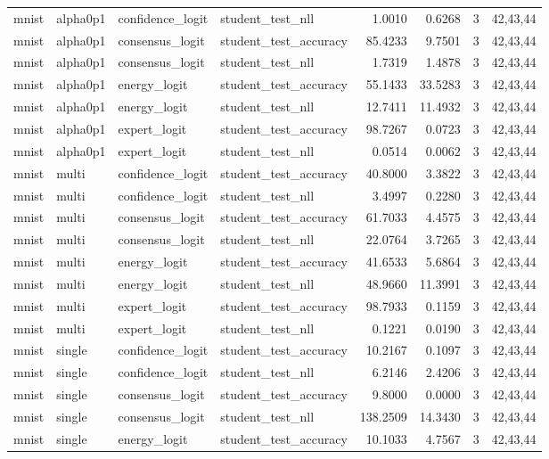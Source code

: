 \begin{tabular}{llllrrrl}
mnist & alpha0p1 & confidence\_logit & student\_test\_nll & 1.0010 & 0.6268 & 3 & 42,43,44 \\
mnist & alpha0p1 & consensus\_logit & student\_test\_accuracy & 85.4233 & 9.7501 & 3 & 42,43,44 \\
mnist & alpha0p1 & consensus\_logit & student\_test\_nll & 1.7319 & 1.4878 & 3 & 42,43,44 \\
mnist & alpha0p1 & energy\_logit & student\_test\_accuracy & 55.1433 & 33.5283 & 3 & 42,43,44 \\
mnist & alpha0p1 & energy\_logit & student\_test\_nll & 12.7411 & 11.4932 & 3 & 42,43,44 \\
mnist & alpha0p1 & expert\_logit & student\_test\_accuracy & 98.7267 & 0.0723 & 3 & 42,43,44 \\
mnist & alpha0p1 & expert\_logit & student\_test\_nll & 0.0514 & 0.0062 & 3 & 42,43,44 \\
mnist & multi & confidence\_logit & student\_test\_accuracy & 40.8000 & 3.3822 & 3 & 42,43,44 \\
mnist & multi & confidence\_logit & student\_test\_nll & 3.4997 & 0.2280 & 3 & 42,43,44 \\
mnist & multi & consensus\_logit & student\_test\_accuracy & 61.7033 & 4.4575 & 3 & 42,43,44 \\
mnist & multi & consensus\_logit & student\_test\_nll & 22.0764 & 3.7265 & 3 & 42,43,44 \\
mnist & multi & energy\_logit & student\_test\_accuracy & 41.6533 & 5.6864 & 3 & 42,43,44 \\
mnist & multi & energy\_logit & student\_test\_nll & 48.9660 & 11.3991 & 3 & 42,43,44 \\
mnist & multi & expert\_logit & student\_test\_accuracy & 98.7933 & 0.1159 & 3 & 42,43,44 \\
mnist & multi & expert\_logit & student\_test\_nll & 0.1221 & 0.0190 & 3 & 42,43,44 \\
mnist & single & confidence\_logit & student\_test\_accuracy & 10.2167 & 0.1097 & 3 & 42,43,44 \\
mnist & single & confidence\_logit & student\_test\_nll & 6.2146 & 2.4206 & 3 & 42,43,44 \\
mnist & single & consensus\_logit & student\_test\_accuracy & 9.8000 & 0.0000 & 3 & 42,43,44 \\
mnist & single & consensus\_logit & student\_test\_nll & 138.2509 & 14.3430 & 3 & 42,43,44 \\
mnist & single & energy\_logit & student\_test\_accuracy & 10.1033 & 4.7567 & 3 & 42,43,44 \\

\end{tabular}

